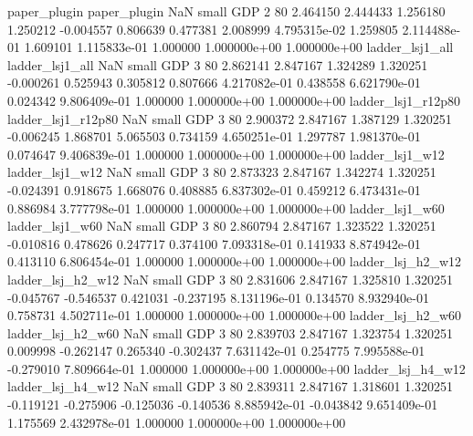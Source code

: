             paper_plugin             paper_plugin                   NaN      small      GDP                 2 80 2.464150       2.444433 1.256180       1.250212   -0.004557      0.806639      0.477381     2.008999   4.795315e-02  1.259805 2.114488e-01     1.609101   1.115833e-01            1.000000    1.000000e+00        1.000000e+00
         ladder_lsj1_all          ladder_lsj1_all                   NaN      small      GDP                 3 80 2.862141       2.847167 1.324289       1.320251   -0.000261      0.525943      0.305812     0.807666   4.217082e-01  0.438558 6.621790e-01     0.024342   9.806409e-01            1.000000    1.000000e+00        1.000000e+00
      ladder_lsj1_r12p80       ladder_lsj1_r12p80                   NaN      small      GDP                 3 80 2.900372       2.847167 1.387129       1.320251   -0.006245      1.868701      5.065503     0.734159   4.650251e-01  1.297787 1.981370e-01     0.074647   9.406839e-01            1.000000    1.000000e+00        1.000000e+00
         ladder_lsj1_w12          ladder_lsj1_w12                   NaN      small      GDP                 3 80 2.873323       2.847167 1.342274       1.320251   -0.024391      0.918675      1.668076     0.408885   6.837302e-01  0.459212 6.473431e-01     0.886984   3.777798e-01            1.000000    1.000000e+00        1.000000e+00
         ladder_lsj1_w60          ladder_lsj1_w60                   NaN      small      GDP                 3 80 2.860794       2.847167 1.323522       1.320251   -0.010816      0.478626      0.247717     0.374100   7.093318e-01  0.141933 8.874942e-01     0.413110   6.806454e-01            1.000000    1.000000e+00        1.000000e+00
       ladder_lsj_h2_w12        ladder_lsj_h2_w12                   NaN      small      GDP                 3 80 2.831606       2.847167 1.325810       1.320251   -0.045767     -0.546537      0.421031    -0.237195   8.131196e-01  0.134570 8.932940e-01     0.758731   4.502711e-01            1.000000    1.000000e+00        1.000000e+00
       ladder_lsj_h2_w60        ladder_lsj_h2_w60                   NaN      small      GDP                 3 80 2.839703       2.847167 1.323754       1.320251    0.009998     -0.262147      0.265340    -0.302437   7.631142e-01  0.254775 7.995588e-01    -0.279010   7.809664e-01            1.000000    1.000000e+00        1.000000e+00
       ladder_lsj_h4_w12        ladder_lsj_h4_w12                   NaN      small      GDP                 3 80 2.839311       2.847167 1.318601       1.320251   -0.119121     -0.275906     -0.125036    -0.140536   8.885942e-01 -0.043842 9.651409e-01     1.175569   2.432978e-01            1.000000    1.000000e+00        1.000000e+00
